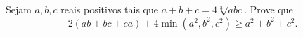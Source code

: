 Sejam $a,b,c$ reais positivos tais que $a+b+c=4\sqrt[3]{abc}$. Prove que \[2\left(ab+bc+ca\right)+4\min\left(a^2,b^2,c^2\right)\geq a^2+b^2+c^2.\]
